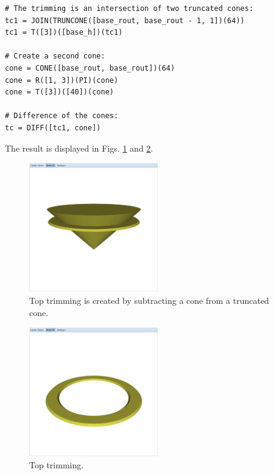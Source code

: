 \documentclass{article}
\begin{document}
{\small
\begin{verbatim}
# The trimming is an intersection of two truncated cones:
tc1 = JOIN(TRUNCONE([base_rout, base_rout - 1, 1])(64))
tc1 = T([3])([base_h])(tc1)

# Create a second cone:
cone = CONE([base_rout, base_rout])(64)
cone = R([1, 3])(PI)(cone)
cone = T([3])([40])(cone)

# Difference of the cones:
tc = DIFF([tc1, cone])
\end{verbatim}
}
\noindent
The result is displayed in Figs. \ref{fig:gear-4} and \ref{fig:gear-5}.

\newpage

\begin{figure}[!ht]
\begin{center}
\includegraphics[width=0.5\textwidth]{img/gear-4.png}
\end{center}
\vspace{-2mm}
\caption{Top trimming is created by subtracting a cone from a truncated cone.}
\label{fig:gear-4}
\end{figure}
\noindent
\noindent

\begin{figure}[!ht]
\begin{center}
\includegraphics[width=0.5\textwidth]{img/gear-5.png}
\end{center}
\vspace{-2mm}
\caption{Top trimming.}
\label{fig:gear-5}
\vspace{-1cm}
\end{figure}
\newpage
\end{document}
